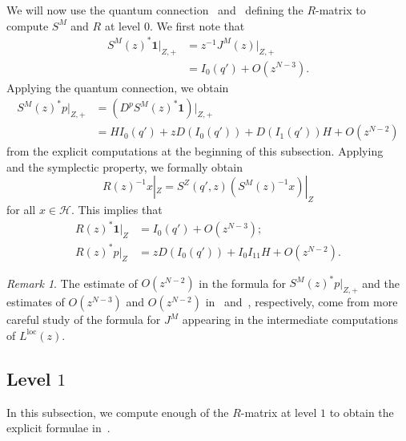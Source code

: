 \documentclass[10pt]{amsart}
\theoremstyle{definition}
\theoremstyle{remark}
\newtheorem{rmk}[thm]{Remark}
\theoremstyle{plain}
\theoremstyle{definition}
\theoremstyle{remark}
\newcommand{\msc}[1]{\mathscr{#1}}
\newcommand{\mr}[1]{\mathrm{#1}}
\newcommand{\1}{\mathbf{1}}
\newcommand{\2}{\mathbf{2}}
\newcommand{\3}{\mathbf{3}}
\newcommand{\loc}{\mr{loc}}
\numberwithin{equation}{section}
\begin{document}
We will now use the quantum connection~ and~ defining the $R$-matrix to compute $S^M$ and $R$ at level $0$. We first note that
\begin{align*}
    S^M(z)^*\1|_{Z,+} &= z^{-1} J^M(z)|_{Z,+} \\
    &= I_0(q') + O(z^{N-3}).
\end{align*}
Applying the quantum connection, we obtain
\begin{align*}
    S^M(z)^*p|_{Z,+} &= (D^p S^M(z)^* \1)|_{Z,+} \\
    &= HI_0(q') + zD(I_0(q')) + D(I_1(q'))H + O(z^{N-2})
\end{align*}
from the explicit computations at the beginning of this subsection. Applying~ and the symplectic property, we formally obtain
\[ R(z)^{-1}x|_Z = S^Z(q',z)(S^M(z)^{-1}x)|_Z \]
for all $x \in \msc{H}$. This implies that
\begin{align}
    R(z)^*\1|_Z &= I_0(q') + O(z^{N-3}); \label{eqn:r1level0} \\
    R(z)^*p|_Z &= z D(I_0(q')) + I_0 I_{11}H + O(z^{N-2}). \label{eqn:rplevel0} 
\end{align}

\begin{rmk}
    The estimate of $O(z^{N-2})$ in the formula for $S^M(z)^*p|_{Z,+}$ and the estimates of $O(z^{N-3})$ and $O(z^{N-2})$ in~ and~, respectively, come from more careful study of the formula for $J^M$ appearing in the intermediate computations of $L^{\loc}(z)$.
\end{rmk}

\subsection{Level $1$}%
\label{sub:Level 1}

In this subsection, we compute enough of the $R$-matrix at level $1$ to obtain the explicit formulae in~.
\end{document}
